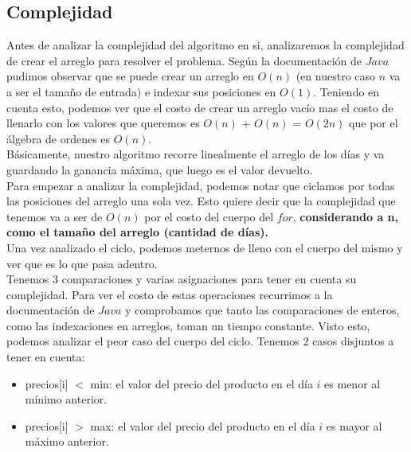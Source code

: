 \subsection{Complejidad}
\indent Antes de analizar la complejidad del algoritmo en si, analizaremos la
complejidad de crear el arreglo para resolver el problema. Según la
documentación de $Java$ pudimos observar que se puede crear un arreglo en $O(n)$
(en nuestro caso $n$ va a ser el tamaño de entrada)
e indexar sus posiciones en $O(1)$. Teniendo en cuenta esto, podemos ver que el
costo de crear un arreglo vacío mas el costo de llenarlo con los valores que
queremos es $O(n)$ + $O(n)$ = $O(2n)$ que por el álgebra de ordenes es $O(n)$.\\
\indent Básicamente, nuestro algoritmo recorre linealmente el arreglo de los
días y va guardando la ganancia máxima, que luego es el valor devuelto.\\
\indent Para empezar a analizar la complejidad, podemos notar que ciclamos por
todas las posiciones del arreglo una sola vez. Esto quiere decir que la
complejidad que tenemos va a ser de $O(n)$ por el costo del cuerpo del $for$,
\textbf{considerando a n, como el tamaño del arreglo (cantidad de días).}\\
\indent Una vez analizado el ciclo, podemos meternos de lleno con el cuerpo del
mismo y ver que es lo que pasa adentro.\\
\indent Tenemos 3 comparaciones y varias asignaciones para tener en cuenta su
complejidad. Para ver el costo de estas operaciones recurrimos a la
documentación de $Java$ y comprobamos que tanto las comparaciones de enteros,
como las indexaciones en arreglos, toman un tiempo constante. Visto esto,
podemos analizar el peor caso del cuerpo del ciclo. Tenemos 2 casos disjuntos a
tener en cuenta:

\begin{itemize}
 \item precios[i] $<$ min: el valor del precio del producto en el día $i$ es
menor al mínimo anterior.
 \item precios[i] $>$ max: el valor del precio del producto en el día $i$ es
mayor al máximo anterior.
\end{itemize}

